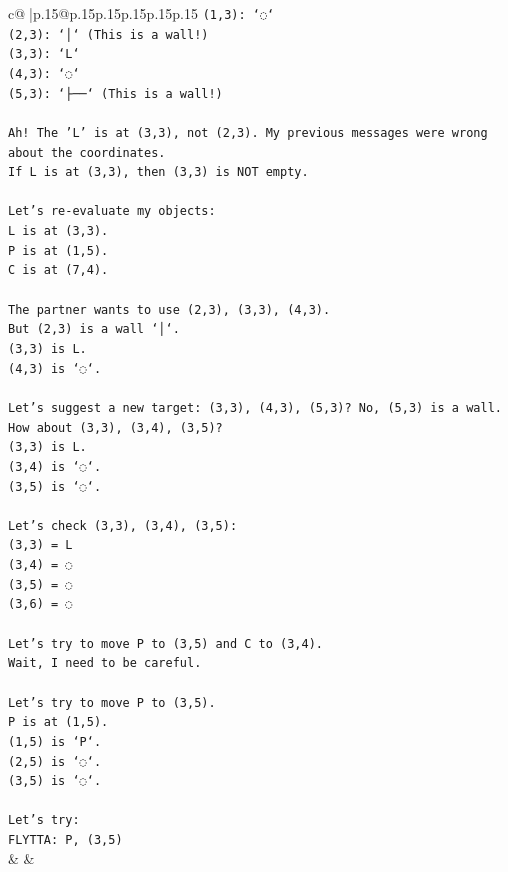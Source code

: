 \documentclass{article}
\begin{document}
{\begin{supertabular}{c@{$\;$}|p{.15\linewidth}@{}p{.15\linewidth}p{.15\linewidth}p{.15\linewidth}p{.15\linewidth}p{.15\linewidth}}
{{{\texttt{(1,3): `◌`} \\
\texttt{(2,3): `│` (This is a wall!)} \\
\texttt{(3,3): `L`} \\
\texttt{(4,3): `◌`} \\
\texttt{(5,3): `├──` (This is a wall!)} \\
\\ 
\texttt{Ah! The 'L' is at (3,3), not (2,3). My previous messages were wrong about the coordinates.} \\
\texttt{If L is at (3,3), then (3,3) is NOT empty.} \\
\\ 
\texttt{Let's re{-}evaluate my objects:} \\
\texttt{L is at (3,3).} \\
\texttt{P is at (1,5).} \\
\texttt{C is at (7,4).} \\
\\ 
\texttt{The partner wants to use (2,3), (3,3), (4,3).} \\
\texttt{But (2,3) is a wall `│`.} \\
\texttt{(3,3) is L.} \\
\texttt{(4,3) is `◌`.} \\
\\ 
\texttt{Let's suggest a new target: (3,3), (4,3), (5,3)? No, (5,3) is a wall.} \\
\texttt{How about (3,3), (3,4), (3,5)?} \\
\texttt{(3,3) is L.} \\
\texttt{(3,4) is `◌`.} \\
\texttt{(3,5) is `◌`.} \\
\\ 
\texttt{Let's check (3,3), (3,4), (3,5):} \\
\texttt{(3,3) = L} \\
\texttt{(3,4) = ◌} \\
\texttt{(3,5) = ◌} \\
\texttt{(3,6) = ◌} \\
\\ 
\texttt{Let's try to move P to (3,5) and C to (3,4).} \\
\texttt{Wait, I need to be careful.} \\
\\ 
\texttt{Let's try to move P to (3,5).} \\
\texttt{P is at (1,5).} \\
\texttt{(1,5) is `P`.} \\
\texttt{(2,5) is `◌`.} \\
\texttt{(3,5) is `◌`.} \\
\\ 
\texttt{Let's try:} \\
\texttt{FLYTTA: P, (3,5)} \\
            }
        }
    }
    & & \\ \\


\end{supertabular}}
\end{document}
